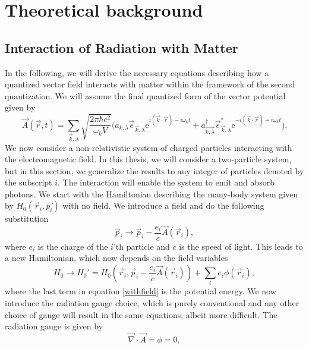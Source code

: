 \chapter{Theoretical background}\label{sec:background}
\section{Interaction of Radiation with Matter}\label{RadMatter}
In the following, we will derive the necessary equations describing how a quantized vector field interacts with matter within the framework of the second quantization. We will assume the final quantized form of the vector potential given by
\begin{equation} \label{quantized}
	\vec{A}(\vec{r},t) = \sum_{\vec{k},\lambda} \sqrt{\frac{2\pi\hbar c^2}{\omega_k V}} \bigg(a_{k,\lambda}\vec{e}_{\vec{k},\lambda}\text{e}^{i(\vec{k}\cdot \vec{r})-i\omega_k t}+a_{\vec{k,\lambda}}^\dagger\vec{e}_{\vec{k},\lambda}^*\text{e}^{-i(\vec{k}\cdot \vec{r})+i\omega_k t}\bigg).
\end{equation}
We now consider a non-relativistic system of charged particles interacting with the electromagnetic field. In this thesis, we will consider a two-particle system, but in this section, we generalize the results to any integer of particles denoted by the subscript $i$. The interaction will enable the system to emit and absorb photons. We start with the Hamiltonian describing the many-body system given by $H_0(\vec{r}_i,\vec{p_i})$ with no field. We introduce a field and do the following substitution 
\begin{equation} \label{substi}
	\vec{p}_i \rightarrow \vec{p}_i - \frac{e_i}{c}\vec{A}(\vec{r}_i),
\end{equation}
where $e_i$ is the charge of the $i$'th particle and $c$ is the speed of light. This leads to a new Hamiltonian, which now depends on the field variables
\begin{equation} \label{withfield}
	H_0 \rightarrow H_0' = H_0 \left( \vec{r}_i,\vec{p}_i-\frac{e_i}{c}\vec{A}(\vec{r}_i)\right) + \sum_i e_i \phi(\vec{r}_i),
\end{equation}
where the last term in equation \eqref{withfield} is the potential energy. We now introduce the radiation gauge choice, which is purely conventional and any other choice of gauge will result in the same equations, albeit more difficult. The radiation gauge \cite{Jackson} is given by 
\begin{equation} \label{RadiationGauge}
	\vec{\nabla}\cdot \vec{A} = \phi = 0,
\end{equation}
